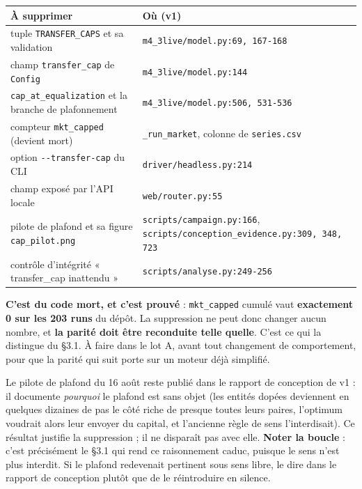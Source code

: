 \documentclass[11pt,a4paper]{article}
\newcommand{\code}[1]{\texttt{#1}}
\begin{document}
\begin{center}
\begin{tabularx}{\linewidth}{@{}XX@{}}
\toprule
\textbf{À supprimer} & \textbf{Où (v1)} \\
\midrule
tuple \code{TRANSFER\_CAPS} et sa validation & \code{m4\_3live/model.py:69, 167-168} \\
champ \code{transfer\_cap} de \code{Config} & \code{m4\_3live/model.py:144} \\
\code{cap\_at\_equalization} et la branche de plafonnement & \code{m4\_3live/model.py:506, 531-536} \\
compteur \code{mkt\_capped} (devient mort) & \code{\_run\_market}, colonne de \code{series.csv} \\
option \code{-{}-transfer-cap} du CLI & \code{driver/headless.py:214} \\
champ exposé par l'API locale & \code{web/router.py:55} \\
pilote de plafond et sa figure \code{cap\_pilot.png} & \code{scripts/campaign.py:166}, \code{scripts/conception\_evidence.py:309, 348, 723} \\
contrôle d'intégrité « transfer\_cap inattendu » & \code{scripts/analyse.py:249-256} \\
\bottomrule
\end{tabularx}
\end{center}

\textbf{C'est du code mort, et c'est prouvé} : \code{mkt\_capped} cumulé vaut \textbf{exactement 0 sur les 203 runs} du dépôt. La suppression ne peut donc changer aucun nombre, et \textbf{la parité doit être reconduite telle quelle}. C'est ce qui la distingue du §3.1. À faire dans le lot A, avant tout changement de comportement, pour que la parité qui suit porte sur un moteur déjà simplifié.

Le pilote de plafond du 16 août reste publié dans le rapport de conception de v1 : il documente \emph{pourquoi} le plafond est sans objet (les entités dopées deviennent en quelques dizaines de pas le côté riche de presque toutes leurs paires, l'optimum voudrait alors leur envoyer du capital, et l'ancienne règle de sens l'interdisait). Ce résultat justifie la suppression ; il ne disparaît pas avec elle. \textbf{Noter la boucle} : c'est précisément le §3.1 qui rend ce raisonnement caduc, puisque le sens n'est plus interdit. Si le plafond redevenait pertinent sous sens libre, le dire dans le rapport de conception plutôt que de le réintroduire en silence.

\bigskip
\end{document}
